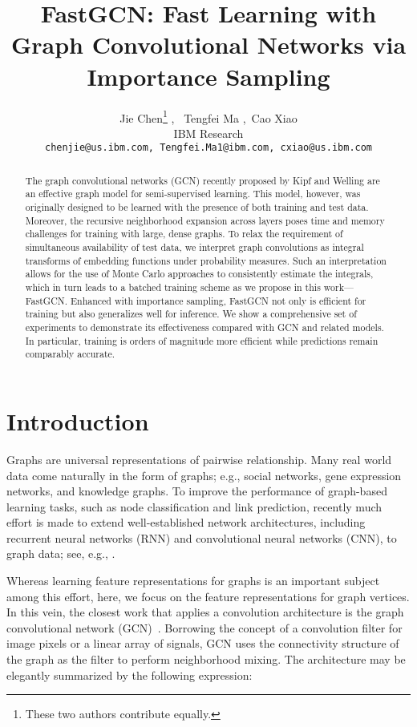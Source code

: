 \documentclass{article} \usepackage{iclr2018_conference,times}
\title{FastGCN: Fast Learning with Graph Convolutional Networks via Importance Sampling}
\author{Jie Chen\thanks{These two authors contribute equally.}\,\,, \,
  Tengfei Ma\footnotemark[1]\,\,,\,
  Cao Xiao \\
IBM Research\\
\texttt{chenjie@us.ibm.com, Tengfei.Ma1@ibm.com, cxiao@us.ibm.com}
}
\theoremstyle{plain}\newtheorem{theorem}{Theorem}\theoremstyle{plain}\newtheorem{proposition}[theorem]{Proposition}
\theoremstyle{plain}\newtheorem{corollary}[theorem]{Corollary}
\theoremstyle{plain}\newtheorem{lemma}[theorem]{Lemma}
\begin{document}
\maketitle

\begin{abstract}
The graph convolutional networks (GCN) recently proposed by Kipf and Welling are an effective graph model for semi-supervised learning. This model, however, was originally designed to be learned with the presence of both training and test data. Moreover, the recursive neighborhood expansion across layers poses time and memory challenges for training with large, dense graphs. To relax the requirement of simultaneous availability of test data, we interpret graph convolutions as integral transforms of embedding functions under probability measures. Such an interpretation allows for the use of Monte Carlo approaches to consistently estimate the integrals, which in turn leads to a batched training scheme as we propose in this work---FastGCN. Enhanced with importance sampling, FastGCN not only is efficient for training but also generalizes well for inference. We show a comprehensive set of experiments to demonstrate its effectiveness compared with GCN and related models. In particular, training is orders of magnitude more efficient while predictions remain comparably accurate.
\end{abstract}


\section{Introduction}

Graphs are universal representations of pairwise relationship. Many real world data come naturally in the form of graphs; e.g., social networks, gene expression networks, and knowledge graphs.
To improve the performance of graph-based learning tasks, such as node classification and link prediction, recently much effort is made to extend well-established network architectures, including recurrent neural networks (RNN) and convolutional neural networks (CNN), to graph data; see, e.g., \cite{DBLP:journals/corr/BrunaZSL13,NIPS2015_5954,DBLP:journals/corr/LiTBZ15,DBLP:journals/corr/JainZSS15,DBLP:journals/corr/HenaffBL15,DBLP:journals/corr/NiepertAK16,DBLP:journals/corr/KipfW16,VAE2016}.

Whereas learning feature representations for graphs is an important subject among this effort, here, we focus on the feature representations for graph vertices. In this vein, the closest work that applies a convolution architecture is the graph convolutional network (GCN)~\citep{DBLP:journals/corr/KipfW16,VAE2016}. Borrowing the concept of a convolution filter for image pixels or a linear array of signals, GCN uses the connectivity structure of the graph as the filter to perform neighborhood mixing. The architecture may be elegantly summarized by the following expression:
\end{document}
